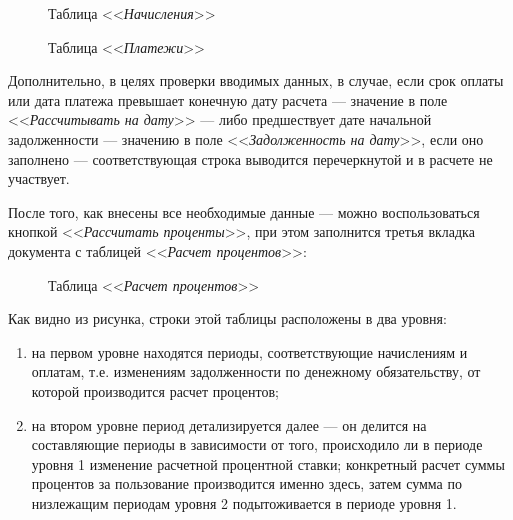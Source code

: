\documentclass[a4paper,12pt,draft]{article}
\begin{document}
\begin{figure}[h]
\caption{Таблица <<{\it Начисления}>>}
\label{ris:pp2}
\end{figure}

\begin{figure}[h]
\caption{Таблица <<{\it Платежи}>>}
\label{ris:pp3}
\end{figure}

Дополнительно, в целях проверки вводимых данных, в случае, если срок оплаты или дата платежа превышает конечную дату расчета --- значение в поле <<{\it Рассчитывать на дату}>> --- либо предшествует дате начальной задолженности --- значению в поле <<{\it Задолженность на дату}>>, если оно заполнено --- соответствующая строка выводится перечеркнутой и в расчете не участвует.

После того, как внесены все необходимые данные --- можно воспользоваться кнопкой <<{\it Рассчитать проценты}>>, при этом заполнится третья вкладка документа с таблицей <<{\it Расчет процентов}>>:
\begin{figure}[h]
\caption{Таблица <<{\it Расчет процентов}>>}
\label{ris:pp4}
\end{figure}

Как видно из рисунка, строки этой таблицы расположены в два уровня:
\begin{enumerate}
\item на первом уровне находятся периоды, соответствующие начислениям и оплатам, т.е. изменениям задолженности по денежному обязательству, от которой производится расчет процентов;
\item на втором уровне период детализируется далее --- он делится на составляющие периоды в зависимости от того, происходило ли в периоде уровня 1 изменение расчетной процентной ставки; конкретный расчет суммы процентов за пользование производится именно здесь, затем сумма по низлежащим периодам уровня 2 подытоживается в периоде уровня 1.
\end{enumerate}
\end{document}
